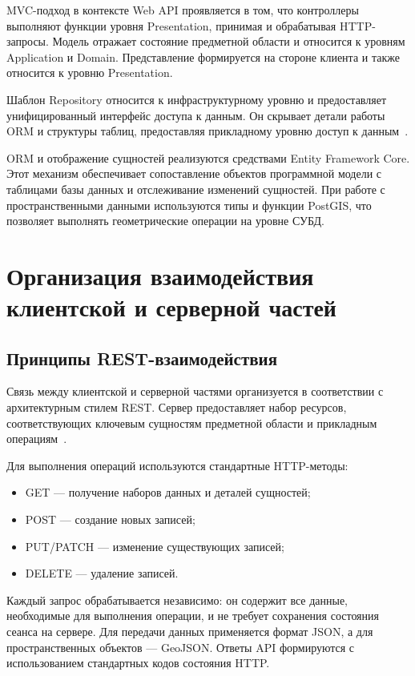 MVC-подход в контексте Web API проявляется в том, что контроллеры выполняют функции уровня Presentation, принимая и обрабатывая HTTP-запросы. Модель отражает состояние предметной области и относится к уровням Application и Domain. Представление формируется на стороне клиента и также относится к уровню Presentation.

Шаблон Repository относится к инфраструктурному уровню и предоставляет унифицированный интерфейс доступа к данным. Он скрывает детали работы ORM и структуры таблиц, предоставляя прикладному уровню доступ к данным~\cite{fowler_repository}.

ORM и отображение сущностей реализуются средствами Entity Framework Core. Этот механизм обеспечивает сопоставление объектов программной модели с таблицами базы данных и отслеживание изменений сущностей. При работе с пространственными данными используются типы и функции PostGIS, что позволяет выполнять геометрические операции на уровне СУБД.

\section{Организация взаимодействия клиентской и серверной частей}

\subsection{Принципы REST-взаимодействия}

Связь между клиентской и серверной частями организуется в соответствии с архитектурным стилем REST. Сервер предоставляет набор ресурсов, соответствующих ключевым сущностям предметной области и прикладным операциям~\cite{fielding2000rest}.

Для выполнения операций используются стандартные HTTP-методы:
\begin{itemize}
\item GET --- получение наборов данных и деталей сущностей;
\item POST --- создание новых записей;
\item PUT/PATCH --- изменение существующих записей;
\item DELETE --- удаление записей.
\end{itemize}

Каждый запрос обрабатывается независимо: он содержит все данные, необходимые для выполнения операции, и не требует сохранения состояния сеанса на сервере. Для передачи данных применяется формат JSON, а для пространственных объектов --- GeoJSON. Ответы API формируются с использованием стандартных кодов состояния HTTP.

